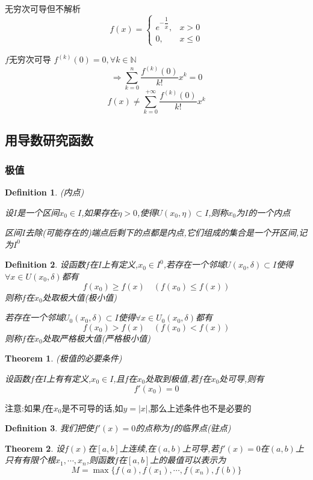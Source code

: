 \documentclass[11pt,hyperref,a4paper,UTF8]{ctexart}
\newtheorem{theorem}{Theorem}[subsection]
\newtheorem{definition}{Definition}[subsection]
\newcommand{\parameter}[1]{\left(#1\right)}
\begin{document}
\begin{CJK}{UTF8}{gkai}
无穷次可导但不解析
\begin{equation}
    f(x) = 
    \begin{cases}
        e^{-\dfrac{1}{x}}, & x > 0\\
        0, & x \leq 0
    \end{cases}
\end{equation}
    
$f$无穷次可导 $f^{(k)}(0) = 0,\forall k\in \mathbb{N}$\\
\[\Rightarrow \sum_{k=0}^n\dfrac{f^{(k)}(0)}{k!}x^k = 0\]
\[f(x)\neq \sum_{k=0}^{+\infty}\dfrac{f^{(k)}(0)}{k!}x^k\]

\subsection{用导数研究函数}
\subsubsection{极值}
\begin{definition}
  (内点)

设$I$是一个区间$x_0\in I$,如果存在$\eta >0$,使得$U(x_0,\eta) \subset I$,则称$x_0$为$I$的一个内点

区间$I$去除(可能存在的)端点后剩下的点都是内点,它们组成的集合是一个开区间,记为$I^0$\\
\end{definition}

\begin{definition}
设函数$f$在$I$上有定义,$x_0\in I^0$,若存在一个邻域$U(x_0,\delta)\subset I$使得$\forall x \in U(x_0,\delta)$都有
\[f(x_0) \geq f(x) \quad \parameter{f(x_0) \leq f(x)}\]
则称$f$在$x_0$处取极大值(极小值)

若存在一个邻域$U_0(x_0,\delta)\subset I$使得$\forall x \in U_0(x_0,\delta)$都有
\[f(x_0) > f(x) \quad \parameter{f(x_0) < f(x)}\]
则称$f$在$x_0$处取严格极大值(严格极小值)
\end{definition}

\begin{theorem}
  (极值的必要条件)

  设函数$f$在$I$上有有定义,$x_0\in I$,且$f$在$x_0$处取到极值,若$f$在$x_0$处可导,则有
  \[f'(x_0) = 0\]
\end{theorem}

注意:如果$f$在$x_0$是不可导的话,如$y = |x|$,那么上述条件也不是必要的

\begin{definition}
我们把使$f'(x) = 0$的点称为$f$的临界点(驻点)
\end{definition}
\begin{theorem}
  设$f(x)$在$[a,b]$上连续,在$(a,b)$上可导,若$f'(x) = 0$在$(a,b)$上只有有限个根$x_1,\cdots ,x_n$,则函数$f$在$[a,b]$上的最值可以表示为
  \[M = \max\{f(a),f(x_1),\cdots,f(x_n),f(b)\}\]


\end{theorem}
\end{CJK}
\end{document}
